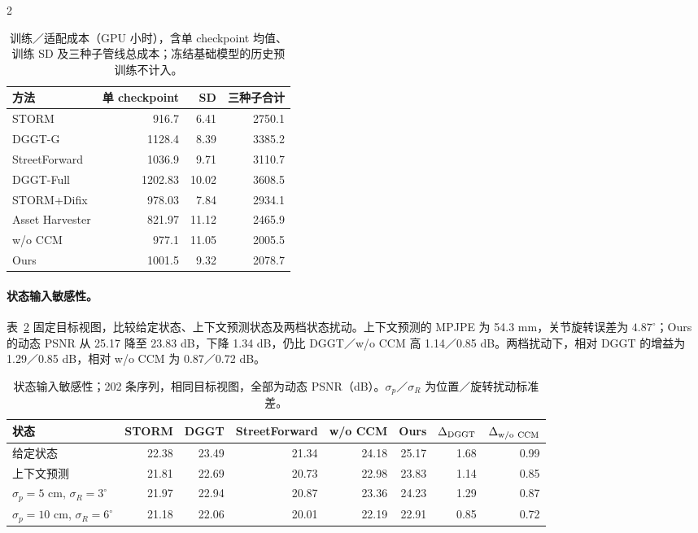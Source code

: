 \begin{multicols}{2}
\begin{table}[H]
\centering\small
\setlength{\tabcolsep}{4pt}
\caption{训练／适配成本（GPU 小时），含单 checkpoint 均值、训练 SD 及三种子管线总成本；冻结基础模型的历史预训练不计入。}
\label{tab:training-cost-statistics}
\begin{tabular}{@{}lrrr@{}}
\toprule
方法 & 单 checkpoint & SD & 三种子合计 \\
\midrule
STORM & 916.7 & 6.41 & 2750.1 \\
DGGT-G & 1128.4 & 8.39 & 3385.2 \\
StreetForward & 1036.9 & 9.71 & 3110.7 \\
DGGT-Full & 1202.83 & 10.02 & 3608.5 \\
STORM+Difix & 978.03 & 7.84 & 2934.1 \\
Asset Harvester & 821.97 & 11.12 & 2465.9 \\
w/o CCM & 977.1 & 11.05 & 2005.5 \\
Ours & 1001.5 & 9.32 & 2078.7 \\
\bottomrule
\end{tabular}
\end{table}

\paragraph{状态输入敏感性。}
表~\ref{tab:state-sensitivity} 固定目标视图，比较给定状态、上下文预测状态及两档状态扰动。上下文预测的 MPJPE 为 54.3 mm，关节旋转误差为 $4.87^\circ$；Ours 的动态 PSNR 从 25.17 降至 23.83 dB，下降 1.34 dB，仍比 DGGT／w/o CCM 高 1.14／0.85 dB。两档扰动下，相对 DGGT 的增益为 1.29／0.85 dB，相对 w/o CCM 为 0.87／0.72 dB。

\end{multicols}
\begin{table}[H]
\centering\small
\setlength{\tabcolsep}{3pt}
\caption{状态输入敏感性；202 条序列，相同目标视图，全部为动态 PSNR（dB）。$\sigma_p$／$\sigma_R$ 为位置／旋转扰动标准差。}
\label{tab:state-sensitivity}
\begin{tabular}{@{}lrrrrrrr@{}}
\toprule
状态 & STORM & DGGT & StreetForward & w/o CCM & Ours & $\Delta_{\rm DGGT}$ & $\Delta_{\rm w/o\ CCM}$ \\
\midrule
给定状态 & 22.38 & 23.49 & 21.34 & 24.18 & 25.17 & 1.68 & 0.99 \\
上下文预测 & 21.81 & 22.69 & 20.73 & 22.98 & 23.83 & 1.14 & 0.85 \\
$\sigma_p=5$ cm, $\sigma_R=3^\circ$ & 21.97 & 22.94 & 20.87 & 23.36 & 24.23 & 1.29 & 0.87 \\
$\sigma_p=10$ cm, $\sigma_R=6^\circ$ & 21.18 & 22.06 & 20.01 & 22.19 & 22.91 & 0.85 & 0.72 \\
\bottomrule
\end{tabular}
\end{table}
